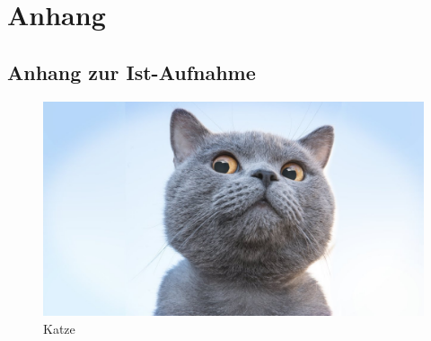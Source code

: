 \section{Anhang}

	\subsection{Anhang zur Ist-Aufnahme}
	\label{sec:AnhangZurIstAufnahme}
	
		\begin{figure}[H]
			\centering
			\includegraphics[width=\linewidth]{resource/cat.jpg}
			\caption{Katze}
			\label{fig:cat}		
		\end{figure}